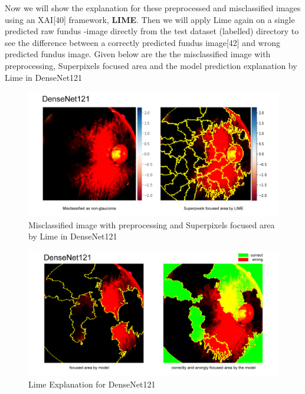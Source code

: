 \vspace{5mm}
\noindent Now we will show the explanation for these preprocessed and misclassified images using an XAI[40] framework, \textbf{LIME}. Then we will apply Lime again on a single predicted raw fundus -image directly from the test dataset (labelled) directory to see the difference between a correctly predicted fundus image[42] and wrong predicted fundus image.
Given below are the the misclassified image with preprocessing, Superpixels focused area and the model prediction explanation by Lime in DenseNet121

\vspace{5mm}
\begin{figure}[hbt!]
\centering
\includegraphics[scale=0.45]{images/fig-42.png}
\caption{Misclassified image with preprocessing and Superpixels focused area by Lime in DenseNet121}
\label{fig:x Misclassified image with preprocessing and Superpixels focused area by Lime in DenseNet121}
\end{figure}

\vspace{5mm}
\begin{figure}[hbt!]
\centering
\includegraphics[scale=0.45]{images/fig-43.png}
\caption{Lime Explanation for DenseNet121}
\label{fig:x Lime Explanation for DenseNet121}
\end{figure}

